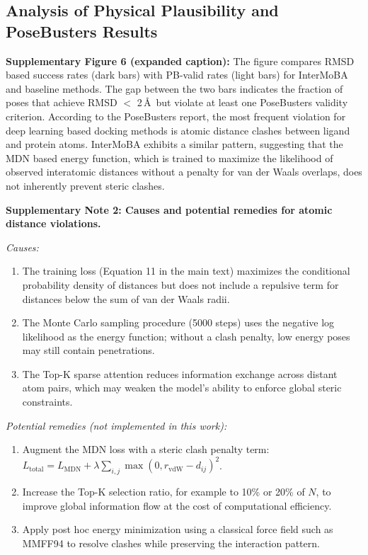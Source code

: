 ﻿\documentclass[11pt,a4paper]{article}
\begin{document}
\subsection{Analysis of Physical Plausibility and PoseBusters Results}

\textbf{Supplementary Figure 6 (expanded caption):} The figure compares RMSD based success rates (dark bars) with PB-valid rates (light bars) for InterMoBA and baseline methods. The gap between the two bars indicates the fraction of poses that achieve RMSD $<$ 2\,\AA\ but violate at least one PoseBusters validity criterion. According to the PoseBusters report, the most frequent violation for deep learning based docking methods is atomic distance clashes between ligand and protein atoms. InterMoBA exhibits a similar pattern, suggesting that the MDN based energy function, which is trained to maximize the likelihood of observed interatomic distances without a penalty for van der Waals overlaps, does not inherently prevent steric clashes.

\textbf{Supplementary Note 2: Causes and potential remedies for atomic distance violations.}

\noindent \textit{Causes:}
\begin{enumerate}
    \item The training loss (Equation 11 in the main text) maximizes the conditional probability density of distances but does not include a repulsive term for distances below the sum of van der Waals radii.
    \item The Monte Carlo sampling procedure (5000 steps) uses the negative log likelihood as the energy function; without a clash penalty, low energy poses may still contain penetrations.
    \item The Top-K sparse attention reduces information exchange across distant atom pairs, which may weaken the model's ability to enforce global steric constraints.
\end{enumerate}

\noindent \textit{Potential remedies (not implemented in this work):}
\begin{enumerate}
    \item Augment the MDN loss with a steric clash penalty term:
    $L_{\text{total}} = L_{\text{MDN}} + \lambda \sum_{i,j} \max(0, r_{\text{vdW}} - d_{ij})^2$.
    \item Increase the Top-K selection ratio, for example to 10\% or 20\% of $N$, to improve global information flow at the cost of computational efficiency.
    \item Apply post hoc energy minimization using a classical force field such as MMFF94 to resolve clashes while preserving the interaction pattern.
\end{enumerate}
\end{document}
